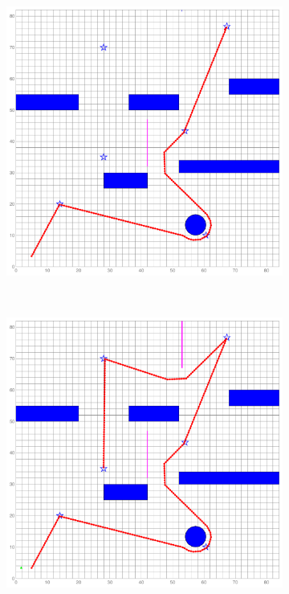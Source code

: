\documentclass[letterpaper, 10 pt, conference]{ieeeconf}
\begin{document}
\begin{figure}
\begin{subfigure}{0.2\textwidth}
			\caption{}
			\label{fig:ref_traj_obs1}
		\end{subfigure}
		~
		\begin{subfigure}{0.2\textwidth}
			\includegraphics[width=\textwidth]{figures/ref_traj_obs2}
			\caption{}
			\label{fig:ref_traj_obs2}
		\end{subfigure}
		~
		\begin{subfigure}{0.2\textwidth}
			\includegraphics[width=\textwidth]{figures/ref_traj_end}

\end{subfigure}
\end{figure}
\end{document}
